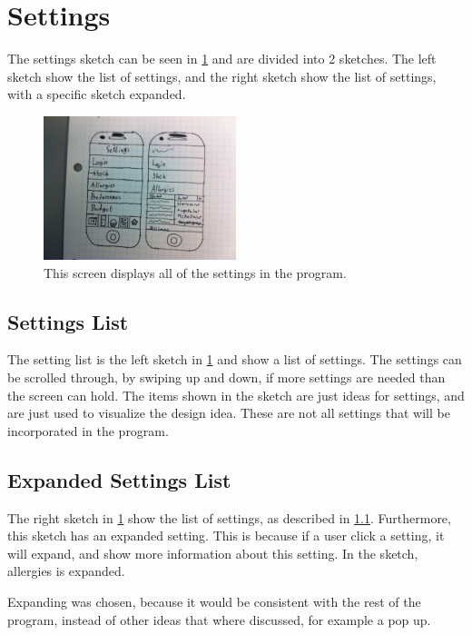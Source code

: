 \section{Settings}

The settings sketch can be seen in \cref{SettingsScreen} and are divided into 2 sketches. The left sketch show the list of settings, and the right sketch show the list of settings, with a specific sketch expanded.

\begin{figure}[H]
	\centering
    \includegraphics[width=0.5\textwidth]{Grafik/FoodPlanner/FinalSettingsSketch}
	\caption{This screen displays all of the settings in the program.}
	\label{SettingsScreen}
\end{figure}

\subsection{Settings List} \label{SettingsList}

The setting list is the left sketch in \cref{SettingsScreen} and show a list of settings. The settings can be scrolled through, by swiping up and down, if more settings are needed than the screen can hold. The items shown in the sketch are just ideas for settings, and are just used to visualize the design idea. These are not all settings that will be incorporated in the program.

\subsection{Expanded Settings List}

The right sketch in \cref{SettingsScreen} show the list of settings, as described in \cref{SettingsList}. Furthermore, this sketch has an expanded setting. This is because if a user click a setting,  it will expand, and show more information about this setting. In the sketch, allergies is expanded.

Expanding was chosen, because it would be consistent with the rest of the program, instead of other ideas that where discussed, for example a pop up. 